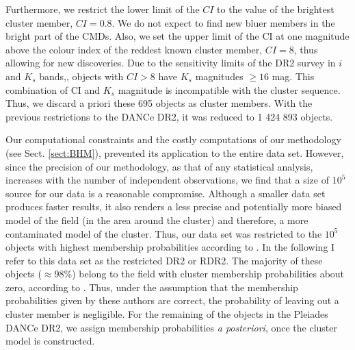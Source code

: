 Furthermore, we restrict the lower limit of the $CI$ to the value of the brightest cluster member, $CI =0.8$. We do not expect to find new bluer members in the bright part of the CMDs. Also, we set the upper limit of the CI at one magnitude above the colour index of the reddest known cluster member, $CI=8$, thus allowing for new discoveries. Due to the sensitivity limits of the DR2 survey in $i$ and $K_s$ bands,\cite[$i\sim23$ mag and $K_s\sim18$ mag, see Appendix A of][]{Bouy2015}, objects with $CI>8$ have $K_s$ magnitudes $\geq 16$ mag. This combination of CI and $K_s$ magnitude is incompatible with the cluster sequence. Thus, we discard a priori these 695 objects as cluster members. With the previous restrictions to the DANCe DR2, it was reduced to 1 424 893 objects.


Our computational constraints and the costly computations of our methodology (see Sect. \ref{sect:BHM}), prevented its application to the entire data set. However, since the precision of our methodology, as that of any statistical analysis, increases with the number of independent observations, we find that a size of $10^5$ source for our data is a reasonable compromise. Although a smaller data set produces faster results, it also renders a less precise and potentially more biased model of the field (in the area around the cluster) and therefore, a more contaminated model of the cluster. Thus, our data set was restricted to the $10^5$ objects with highest membership probabilities according to \citet{Bouy2015}. In the following I refer to this data set as the restricted DR2 or RDR2. The majority of these objects ($\approx$98\%) belong to the field with cluster membership probabilities about zero, according to \citet{Sarro2014,Bouy2015}. Thus, under the assumption that the membership probabilities given by these authors are correct, the probability of leaving out a cluster member is negligible. For the remaining of the objects in the Pleiades DANCe DR2, we assign membership probabilities \emph{a posteriori}, once the cluster model is constructed. 



